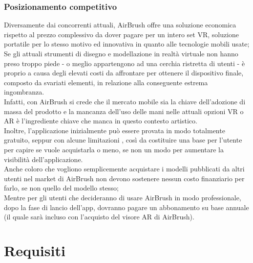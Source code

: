 \documentclass[11pt,fleqn]{book} %
\begin{document}
\subsection{Posizionamento competitivo}
Diversamente dai concorrenti attuali, AirBrush offre una soluzione economica rispetto al prezzo complessivo da dover pagare per un intero set VR, soluzione portatile per lo stesso motivo ed innovativa in quanto alle tecnologie mobili usate; \\
Se gli attuali strumenti di disegno e modellazione in realtà virtuale  non hanno preso troppo piede - o meglio appartengono ad una cerchia ristretta di utenti - è proprio a causa degli elevati costi da affrontare per ottenere il dispositivo finale, composto da svariati elementi, in relazione alla conseguente estrema ingombranza.\\
Infatti, con AirBrush si crede che il mercato mobile sia la chiave dell'adozione di massa del prodotto e la mancanza dell'uso delle mani nelle attuali opzioni VR o AR è l'ingrediente chiave che manca in questo contesto artistico.\\
Inoltre, l'applicazione inizialmente può essere provata in modo totalmente gratuito, seppur con alcune limitazioni , così da costituire una base per l'utente per capire se vuole acquistarla o meno, se non un modo per aumentare la visibilità dell'applicazione.\\
Anche coloro che vogliono semplicemente acquistare i modelli pubblicati da altri utenti nel market di AirBrush  non devono sostenere nessun costo finanziario per farlo, se non quello del modello stesso;\\
Mentre per gli utenti che decideranno di usare AirBrush in modo professionale, dopo la fase di lancio dell'app, dovranno pagare un abbonamento su base annuale (il quale sarà incluso con l'acquisto del visore AR di AirBrush).





\chapter{Requisiti}
\end{document}
